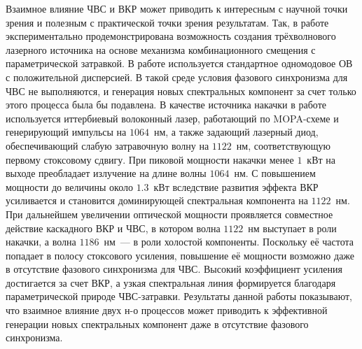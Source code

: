 Взаимное влияние ЧВС и ВКР может приводить к интересным с научной точки зрения и полезным с практической точки зрения результатам. Так, в работе~\cite{eibl2017pulse} экспериментально продемонстрирована возможность создания трёхволнового лазерного источника на основе механизма комбинационного смещения с параметрической затравкой. В работе используется стандартное одномодовое ОВ с положительной дисперсией.  В такой среде условия фазового синхронизма для ЧВС не выполняются, и генерация новых спектральных компонент за счет только этого процесса была бы подавлена.
В качестве источника накачки в работе используется иттербиевый волоконный лазер, работающий по MOPA-схеме и генерирующий импульсы на $1064$~нм, а также задающий лазерный диод, обеспечивающий слабую затравочную волну на $1122$~нм, соответствующую первому стоксовому сдвигу. При пиковой мощности накачки менее $1$~кВт на выходе преобладает излучение на длине волны $1064$~нм. С повышением мощности до величины около $1.3$~кВт вследствие развития эффекта ВКР усиливается и становится доминирующей спектральная компонента на $1122$~нм. При дальнейшем увеличении оптической мощности проявляется совместное действие каскадного ВКР и ЧВС, в котором волна $1122$~нм выступает в роли накачки, а волна $1186$~нм~--- в роли холостой компоненты. Поскольку её частота попадает в полосу стоксового усиления, повышение её мощности возможно даже в отсутствие фазового синхронизма для ЧВС. Высокий коэффициент усиления достигается за счет ВКР, а узкая спектральная линия формируется благодаря параметрической природе ЧВС-затравки.  Результаты данной работы показывают, что взаимное влияние двух н-о процессов может приводить к эффективной генерации новых спектральных компонент даже в отсутствие фазового синхронизма.


